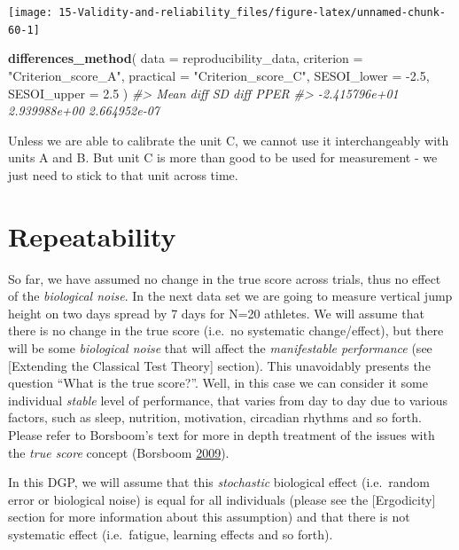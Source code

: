 \documentclass[
]{book}
\newenvironment{Shaded}{\begin{snugshade}}{\end{snugshade}}
\newcommand{\CommentTok}[1]{\textcolor[rgb]{0.56,0.35,0.01}{\textit{#1}}}
\newcommand{\DataTypeTok}[1]{\textcolor[rgb]{0.13,0.29,0.53}{#1}}
\newcommand{\FloatTok}[1]{\textcolor[rgb]{0.00,0.00,0.81}{#1}}
\newcommand{\KeywordTok}[1]{\textcolor[rgb]{0.13,0.29,0.53}{\textbf{#1}}}
\newcommand{\NormalTok}[1]{#1}
\newcommand{\StringTok}[1]{\textcolor[rgb]{0.31,0.60,0.02}{#1}}
\begin{document}
\begin{center}\texttt{[image: 15-Validity-and-reliability\_files/figure-latex/unnamed-chunk-60-1]} \end{center}

\begin{Shaded}
\begin{Highlighting}[]
\KeywordTok{differences\_method}\NormalTok{(}
  \DataTypeTok{data =}\NormalTok{ reproducibility\_data,}
  \DataTypeTok{criterion =} \StringTok{"Criterion\_score\_A"}\NormalTok{,}
  \DataTypeTok{practical =} \StringTok{"Criterion\_score\_C"}\NormalTok{,}
  \DataTypeTok{SESOI\_lower =} \FloatTok{{-}2.5}\NormalTok{,}
  \DataTypeTok{SESOI\_upper =} \FloatTok{2.5}
\NormalTok{)}
\CommentTok{\#>     Mean diff       SD diff          PPER }
\CommentTok{\#> {-}2.415796e+01  2.939988e+00  2.664952e{-}07}
\end{Highlighting}
\end{Shaded}

Unless we are able to calibrate the unit C, we cannot use it interchangeably with units A and B. But unit C is more than good to be used for measurement - we just need to stick to that unit across time.

\hypertarget{repeatability}{%
\section{Repeatability}\label{repeatability}}

So far, we have assumed no change in the true score across trials, thus no effect of the \emph{biological noise}. In the next data set we are going to measure vertical jump height on two days spread by 7 days for N=20 athletes. We will assume that there is no change in the true score (i.e.~no systematic change/effect), but there will be some \emph{biological noise} that will affect the \emph{manifestable performance} (see {[}Extending the Classical Test Theory{]} section). This unavoidably presents the question ``What is the true score?''. Well, in this case we can consider it some individual \emph{stable} level of performance, that varies from day to day due to various factors, such as sleep, nutrition, motivation, circadian rhythms and so forth. Please refer to Borsboom's text for more in depth treatment of the issues with the \emph{true score} concept (Borsboom \protect\hyperlink{ref-borsboomMeasuringMindConceptual2009}{2009}).

In this DGP, we will assume that this \emph{stochastic} biological effect (i.e.~random error or biological noise) is equal for all individuals (please see the {[}Ergodicity{]} section for more information about this assumption) and that there is not systematic effect (i.e.~fatigue, learning effects and so forth).
\end{document}
